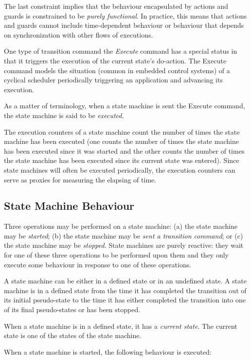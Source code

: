 The last constraint implies that the behaviour encapsulated by actions and guards is
constrained to be \emph{purely functional}. In practice, this means that actions and guards cannot
include time-dependent behaviour or behaviour that depends on synchronization with other
flows of executions.

One type of transition command the \emph{Execute} command has a special status in that it triggers the execution of the current state's do-action. 
The Execute command models the situation (common in embedded control systems) of a cyclical scheduler periodically triggering 
an application and advancing its execution.

As a matter of terminology, when a state machine is sent the Execute command, the state
machine is said to be \emph{executed}.

The execution counters of a state machine count the number of times the state machine has
been executed (one counts the number of times the state machine has been executed since it 
was started and the other counts the number of times the state machine has been executed
since its current state was entered). Since state machines will often be executed periodically,
the execution counters can serve as proxies for measuring the elapsing of time.


\subsection{State Machine Behaviour}
Three operations may be performed on a state machine: 
(a) the state machine may be \emph{started}; 
(b) the state machine may be \emph{sent a transition command}; or 
(c) the state machine may be \emph{stopped}. 
State machines are purely reactive: they wait for one of these three operations to be performed 
upon them and they only execute some behaviour in response to one of these operations. 

A state machine can be either in a defined state or in an undefined state. 
A state machine is in a defined state from the time it has completed the 
transition out of its initial pseudo-state to the time it has either completed the transition into one of its final pseudo-states or has been stopped.

When a state machine is in a defined state, it has a \emph{current state}. The current state is one of the states of the state machine.

When a state machine is started, the following behaviour is executed:

